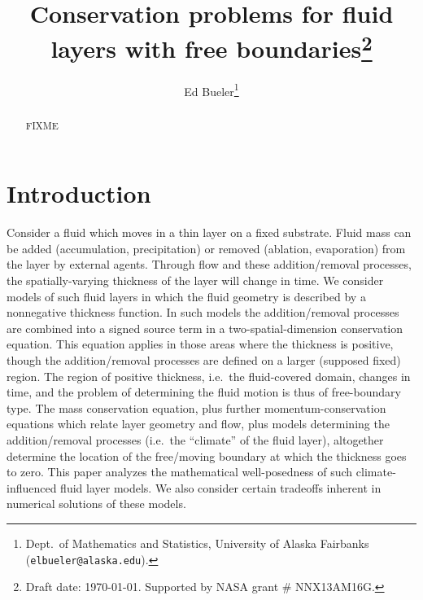 \documentclass[final,leqno,onefignum,onetabnum]{siamltex1213bueler}
\title{Conservation problems for fluid layers with free boundaries\thanks{Draft date: \today.  Supported by NASA grant \# NNX13AM16G.}}
\author{Ed Bueler\thanks{Dept.~of Mathematics and Statistics, University of Alaska Fairbanks \,\, (\texttt{elbueler@alaska.edu}).}}
\begin{document}
\maketitle
{}

\begin{abstract}
FIXME
\end{abstract}


\pagestyle{myheadings}
\thispagestyle{plain}


\section{Introduction}  \label{sec:intro}

Consider a fluid which moves in a thin layer on a fixed substrate.  Fluid mass can be added (accumulation, precipitation) or removed (ablation, evaporation) from the layer by external agents.  Through flow and these addition/removal processes, the spatially-varying thickness of the layer will change in time.  We consider models of such fluid layers in which the fluid geometry is described by a nonnegative thickness function.  In such models the addition/removal processes are combined into a signed source term in a two-spatial-dimension conservation equation.  This equation applies in those areas where the thickness is positive, though the addition/removal processes are defined on a larger (supposed fixed) region.  The region of positive thickness, i.e.~the fluid-covered domain, changes in time, and the problem of determining the fluid motion is thus of free-boundary type.  The mass conservation equation, plus further momentum-conservation equations which relate layer geometry and flow, plus models determining the addition/removal processes (i.e.~the ``climate'' of the fluid layer), altogether determine the location of the free/moving boundary at which the thickness goes to zero.  This paper analyzes the mathematical well-posedness of such climate-influenced fluid layer models.  We also consider certain tradeoffs inherent in numerical solutions of these models.

%
\end{document}
